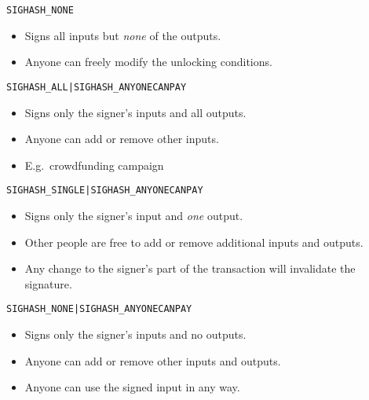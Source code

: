 \documentclass[]{beamer}
\begin{document}
\begin{frame}{\texttt{SIGHASH\_NONE}}
	\begin{figure}
			
	\end{figure}
	\begin{itemize}
		\item Signs all inputs but \emph{none} of the outputs.
		\item Anyone can freely modify the unlocking conditions.
	\end{itemize}
\end{frame}

\begin{frame}{\texttt{SIGHASH\_ALL|SIGHASH\_ANYONECANPAY}}
	\begin{figure}
		
	\end{figure}
	\begin{itemize}
		\item Signs only the signer's inputs and all outputs.
		\item Anyone can add or remove other inputs.
		\item E.g.\ crowdfunding campaign
	\end{itemize}
\end{frame}

\begin{frame}{\texttt{SIGHASH\_SINGLE|SIGHASH\_ANYONECANPAY}}
	\begin{figure}
			
	\end{figure}
	\begin{itemize}
		\item Signs only the signer's input and \emph{one} output.
		\item Other people are free to add or remove additional inputs and outputs.\\
		\item Any change to the signer's part of the transaction will invalidate the signature.	
	\end{itemize}
\end{frame}

\begin{frame}{\texttt{SIGHASH\_NONE|SIGHASH\_ANYONECANPAY}}
	\begin{figure}
		
	\end{figure}
	\begin{itemize}
		\item Signs only the signer's inputs and no outputs.
		\item Anyone can add or remove other inputs and outputs.
		\item Anyone can use the signed input in any way.	
	\end{itemize}
\end{frame}
\end{document}
